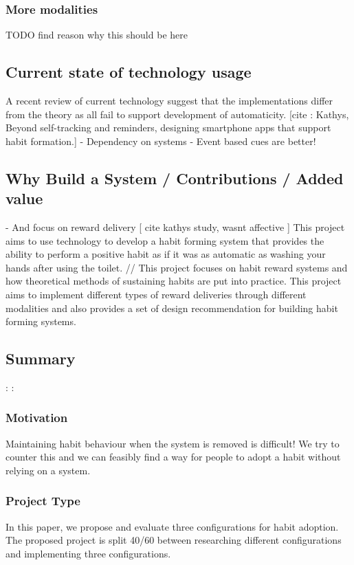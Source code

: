 {\subsubsection*{More modalities}
TODO find reason why this should be here


\subsection*{Current state of technology usage}

A recent review of current technology suggest that the implementations differ from the theory as all fail to support development of automaticity. [cite : Kathys, Beyond self-tracking and reminders, designing smartphone apps that support habit formation.]
- Dependency on systems
- Event based cues are better!

\subsection*{Why Build a System / Contributions / Added value}

- And focus on reward delivery [ cite kathys study, wasnt affective ]
This project aims to use technology to develop a habit forming system that provides the ability to perform a positive habit as if it was as automatic as washing your hands after using the toilet. // This project focuses on habit reward systems and how theoretical methods of sustaining habits are put into practice. This project aims to implement different types of reward deliveries through different modalities and also provides a set of design recommendation for building habit forming systems.

\subsection*{Summary}

:\newline
:

\subsubsection*{Motivation}
Maintaining habit behaviour when the system is removed is difficult! We try to counter this and we can feasibly find a way for people to adopt a habit without relying on a system.


\subsubsection*{Project Type}
In this paper, we propose and evaluate three configurations for habit adoption.
The proposed project is split 40/60 between researching different configurations and implementing three configurations.


}

